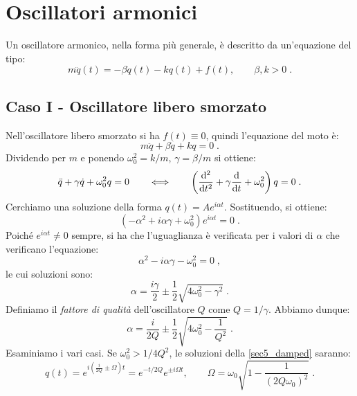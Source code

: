 \section{Oscillatori armonici}
Un oscillatore armonico, nella forma più generale, è descritto da un'equazione del tipo:
\begin{equation}
m\ddot{q}(t)=-\beta\dot{q}(t)-kq(t)+f(t), \qquad \beta,k>0\;.
\end{equation}
\subsection{Caso I - Oscillatore libero smorzato}
Nell'oscillatore libero smorzato si ha $f(t)\equiv 0$, quindi l'equazione del moto è:
\begin{equation}
m\ddot{q}+\beta\dot{q}+kq=0\;. \label{sec5_damped}
\end{equation}
Dividendo per $m$ e ponendo $\omega_0^2=k/m$, $\gamma=\beta/m$ si ottiene:
\begin{equation}
\ddot{q}+\gamma\dot{q}+\omega_0^2q=0\qquad  \Longleftrightarrow\qquad  \left(\frac{\diff^2}{\diff[t]^2}+\gamma\frac{\diff}{\diff[t]}+\omega_0^2\right)q=0\;.
\end{equation}
Cerchiamo una soluzione della forma $q(t)=Ae^{i\alpha t}$. Sostituendo, si ottiene:
\begin{equation}
(-\alpha^2+i\alpha\gamma+\omega_0^2)e^{i\alpha t}=0\;.
\end{equation}
Poiché $e^{i\alpha t}\ne 0$ sempre, si ha che l'uguaglianza è verificata per i valori di $\alpha$ che verificano l'equazione:
\begin{equation}
\alpha^2-i\alpha\gamma-\omega_0^2=0\;,
\end{equation}
le cui soluzioni sono:
\begin{equation}
\alpha=\frac{i\gamma}{2}\pm\frac{1}{2}\sqrt{4\omega_0^2-\gamma^2}\;.
\end{equation}
Definiamo il \textit{fattore di qualità} dell'oscillatore $Q$ come $Q=1/\gamma$. Abbiamo dunque:
\begin{equation}
\alpha=\frac{i}{2Q}\pm\frac{1}{2}\sqrt{4\omega_0^2-\frac{1}{Q^2}}\;.
\end{equation}
Esaminiamo i vari casi. Se $\omega_0^2>1/4Q^2$, le soluzioni della \eqref{sec5_damped} saranno:
\begin{equation}
q(t)=e^{i\left(\frac{i}{2Q}\pm\Omega\right)t}=e^{-t/2Q}e^{\pm i\Omega t}, \qquad \Omega=\omega_0\sqrt{1-\frac{1}{(2Q\omega_0)^2}}\;.
\end{equation}
